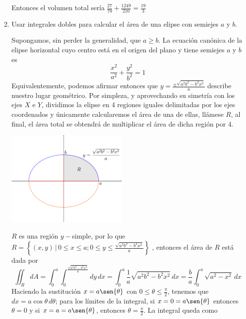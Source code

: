 \documentclass{article}
\begin{document}
\begin{enumerate}
{				Entonces el volumen total sería $\frac{27}{70} + \frac{1249}{210} = \frac{19}{3}$



    }

    \item {
        Usar integrales dobles para calcular el área de una elipse con semiejes $a$ y $b$.

        \color{azul}
        Supongamos, sin perder la generalidad, que $a\geq b$. La ecuación canónica de la elipse horizontal cuyo centro está en el origen del plano y tiene semiejes $a$ y $b$ es
        \[
            \frac{x^2}{a^2}+\frac{y^2}{b^2}=1
        \]
        Equivalentemente, podemos afirmar entonces que
        \(\displaystyle
            y=\frac{\pm\sqrt{a^2 b^2 -b^2 x^2}}{a}
        \)
        describe nuestro lugar geométrico. Por simpleza, y aprovechando su simetría con los ejes $X$ e $Y$, dividimos la elipse en 4 regiones iguales delimitadas por los ejes coordenados y únicamente calcularemos el área de una de ellas, llámese $R$, al final, el área total se obtendrá de multiplicar el área de dicha región por 4.
        \begin{center}
            \includegraphics[width=6cm]{img/ej4.png}
        \end{center}
        $R$ es una región $y-$simple, por lo que
        \(\displaystyle
            R=\left\{
                (x,y)\,\bigg\vert\,
                0\leq x\leq a;
                0\leq y\leq\frac{\sqrt{a^2b^2-b^2x^2}}{a}
            \right\}
        \)
        , entonces el área de $R$ está dada por
        \[
            \iint_R{dA}
            =\int_0^a{\int_0^{ \frac{\sqrt{a^2b^2-b^2x^2}}{a} }{dy}\,dx}
            =\int_0^a{\frac{1}{a}\sqrt{a^2b^2-b^2x^2}\,dx}
            =\frac{b}{a}\int_0^a{\sqrt{a^2-x^2}\,dx}
        \]
        Haciendo la sustitución $x=a \sen{\theta}$ con $0\leq\theta\leq\frac{\pi}{2}$, tenemos que $dx=a\cos{\theta}\,d\theta$; para los límites de la integral, si $x=0=a\sen{\theta}$ entonces $\theta=0$ y si $x=a=a\sen{\theta}$, entonces $\theta=\frac{\pi}{2}$. La integral queda como
}
\end{enumerate}
\end{document}
